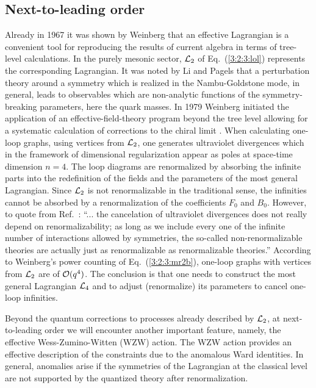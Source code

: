 \documentclass[twoside,12pt]{article}
\begin{document}
\subsection{Next-to-leading order}
   Already in 1967 it was shown by Weinberg \cite{Weinberg:1966fm} that an
effective Lagrangian is a convenient tool for reproducing
the results of current algebra in terms of tree-level calculations.
   In the purely mesonic sector, ${\cal L}_2$ of Eq.\ (\ref{3:2:3:lol})
represents the corresponding Lagrangian.
   It was noted by Li and Pagels \cite{Li:1971vr} that a perturbation theory around
a symmetry which is realized in the Nambu-Goldstone mode, in general, leads
to observables which are non-analytic functions of the symmetry-breaking
parameters, here the quark masses.
   In 1979 Weinberg initiated the application of an effective-field-theory
program beyond the tree level allowing for a systematic
calculation of corrections to the chiral limit \cite{Weinberg:1978kz}.
   When calculating one-loop graphs, using vertices from ${\cal L}_2$, one generates ultraviolet
divergences which in the framework of dimensional regularization appear
as poles at space-time dimension $n=4$.
   The loop diagrams are renormalized by absorbing the infinite parts
into the redefinition of the fields and the parameters of the most
general Lagrangian.
   Since ${\cal L}_2$ is not renormalizable in
the traditional sense, the infinities cannot be absorbed by a renormalization
of the coefficients $F_0$ and $B_0$.
   However, to quote from Ref.\ \cite{Weinberg:1995mt}:
   ``... the cancelation of ultraviolet divergences does
not really depend on renormalizability; as long as we include every one of the
infinite number of interactions allowed by symmetries, the so-called
non-renormalizable theories are actually just as renormalizable as renormalizable
theories.''
   According to Weinberg's power counting of Eq.\ (\ref{3:2:3:mr2b}),
one-loop graphs with vertices from ${\cal L}_2$ are of ${\cal O}(q^4)$.
   The conclusion is that one needs to construct the most general Lagrangian
${\cal L}_4$ and to adjust (renormalize) its parameters to cancel one-loop infinities.

   Beyond the quantum corrections to processes already described by ${\cal L}_2$,
at next-to-leading order we will encounter another important feature,
namely, the effective Wess-Zumino-Witten (WZW) action.
   The WZW action provides an effective description of the
constraints due to the anomalous Ward identities.
   In general, anomalies arise if the symmetries of the Lagrangian at the classical
level are not supported by the quantized theory after renormalization.
\end{document}
